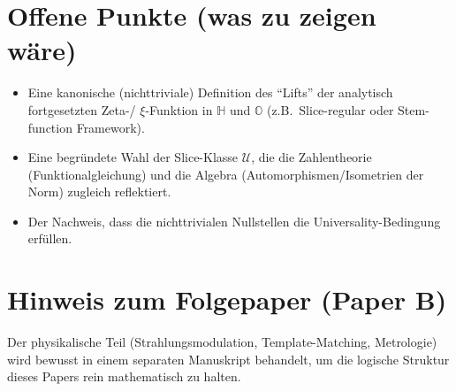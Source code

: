 \documentclass[11pt,a4paper]{article}
\theoremstyle{plain}
\theoremstyle{definition}
\theoremstyle{remark}
\newcommand{\Hh}{\mathbb{H}}
\newcommand{\Okt}{\mathbb{O}}
\begin{document}
\section{Offene Punkte (was zu zeigen w\"are)}
\begin{itemize}
\item Eine kanonische (nichttriviale) Definition des ``Lifts'' der analytisch fortgesetzten Zeta-/
$\xi$-Funktion in $\Hh$ und $\Okt$ (z.B.\ Slice-regular oder Stem-function Framework).
\item Eine begr\"undete Wahl der Slice-Klasse $\mathcal{U}$, die die Zahlentheorie (Funktionalgleichung)
und die Algebra (Automorphismen/Isometrien der Norm) zugleich reflektiert.
\item Der Nachweis, dass die nichttrivialen Nullstellen die Universality-Bedingung erf\"ullen.
\end{itemize}

\section*{Hinweis zum Folgepaper (Paper B)}
Der physikalische Teil (Strahlungsmodulation, Template-Matching, Metrologie) wird bewusst in einem
separaten Manuskript behandelt, um die logische Struktur dieses Papers rein mathematisch zu halten.
\end{document}
